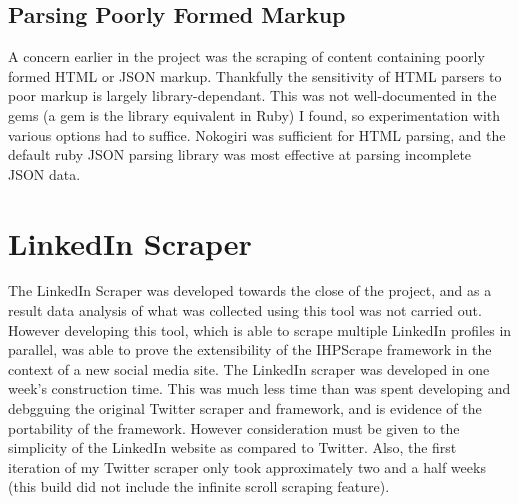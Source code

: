 \subsection{Parsing Poorly Formed Markup}

A concern earlier in the project was the scraping of content containing poorly formed HTML or JSON markup. Thankfully the sensitivity of HTML parsers to poor markup is largely library-dependant. This was not well-documented in the gems (a gem is the library equivalent in Ruby) I found, so experimentation with various options had to suffice. Nokogiri was sufficient for HTML parsing, and the default ruby JSON parsing library was most effective at parsing incomplete JSON data.










\section{LinkedIn Scraper}

The LinkedIn Scraper was developed towards the close of the project, and as a result data analysis of what was collected using this tool was not carried out. However developing this tool, which is able to scrape multiple LinkedIn profiles in parallel, was able to prove the extensibility of the IHPScrape framework in the context of a new social media site. The LinkedIn scraper was developed in one week's construction time. This was much less time than was spent developing and debgguing the original Twitter scraper and framework, and is evidence of the portability of the framework. However consideration must be given to the simplicity of the LinkedIn website as compared to Twitter. Also, the first iteration of my Twitter scraper only took approximately two and a half weeks (this build did not include the infinite scroll scraping feature). 

